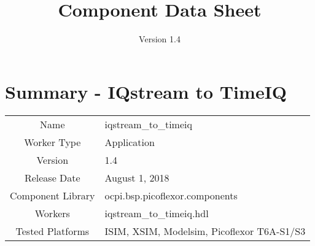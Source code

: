 \iffalse
This file is protected by Copyright. Please refer to the COPYRIGHT file
distributed with this source distribution.

This file is part of OpenCPI <http://www.opencpi.org>

OpenCPI is free software: you can redistribute it and/or modify it under the
terms of the GNU Lesser General Public License as published by the Free Software
Foundation, either version 3 of the License, or (at your option) any later
version.

OpenCPI is distributed in the hope that it will be useful, but WITHOUT ANY
WARRANTY; without even the implied warranty of MERCHANTABILITY or FITNESS FOR A
PARTICULAR PURPOSE. See the GNU Lesser General Public License for more details.

You should have received a copy of the GNU Lesser General Public License along
with this program. If not, see <http://www.gnu.org/licenses/>.
\fi

\def\docTitle{Component Data Sheet}
\def\docVersion{1.4}

\date{Version \docVersion} %
\title{\docTitle}
\lhead{\small{\docTitle}}

\usepackage{longtable} %

\def\comp{iqstream\_to\_timeiq}
\def\ecomp{iqstream_to_timeiq}
\def\Comp{IQstream to TimeIQ}
\graphicspath{ {figures/} }



\section*{Summary - \Comp}
\begin{tabular}{|c|M{13.5cm}|}
	\hline
	                  &                        							\\
	\hline
	Name              & \comp                  							\\
	\hline
	Worker Type       & Application            							\\
	\hline
	Version           & 1.4                  							\\
	\hline
	Release Date      & August 1, 2018           						\\
	\hline
	Component Library & ocpi.bsp.picoflexor.components 					\\
	\hline
	Workers           & \comp.hdl              							\\
	\hline
	Tested Platforms  & ISIM, XSIM, Modelsim, Picoflexor T6A-S1/S3		\\
	\hline
\end{tabular}
	
